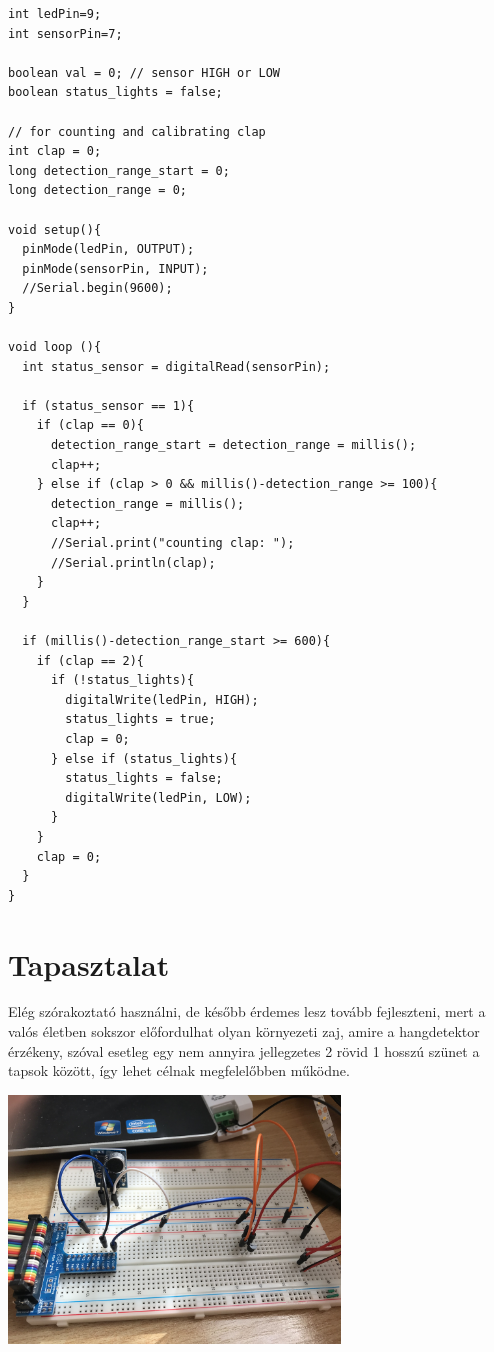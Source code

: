 \documentclass[a4paper,11pt]{article}
\begin{document}
\begin{lstlisting}
int ledPin=9;
int sensorPin=7;

boolean val = 0; // sensor HIGH or LOW
boolean status_lights = false;

// for counting and calibrating clap
int clap = 0;
long detection_range_start = 0;
long detection_range = 0;

void setup(){
  pinMode(ledPin, OUTPUT);
  pinMode(sensorPin, INPUT);
  //Serial.begin(9600);
}
  
void loop (){
  int status_sensor = digitalRead(sensorPin);
  
  if (status_sensor == 1){
    if (clap == 0){
      detection_range_start = detection_range = millis();
      clap++; 
    } else if (clap > 0 && millis()-detection_range >= 100){
      detection_range = millis();
      clap++;
      //Serial.print("counting clap: ");
      //Serial.println(clap);
    }
  }
  
  if (millis()-detection_range_start >= 600){
    if (clap == 2){ 
      if (!status_lights){
        digitalWrite(ledPin, HIGH);
        status_lights = true;
        clap = 0;
      } else if (status_lights){
        status_lights = false;
        digitalWrite(ledPin, LOW);
      }
    }
    clap = 0;
  }
}
\end{lstlisting} 

\section{Tapasztalat}

Elég szórakoztató használni, de később érdemes lesz tovább fejleszteni, mert a valós életben sokszor előfordulhat olyan környezeti zaj, amire a hangdetektor érzékeny, szóval esetleg egy nem annyira jellegzetes 2 rövid 1 hosszú szünet a tapsok között, így lehet célnak megfelelőbben működne.

\begin{center}
\includegraphics[width=0.66\textwidth]{clapping_lamp.jpg}
\end{center}
\end{document}
